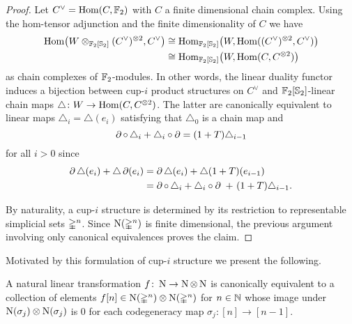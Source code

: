 \begin{proof}
	Let $C^\vee = \mathrm{Hom}(C, {\mathbb{F}_2})$ with $C$ a finite dimensional chain complex.
	Using the hom-tensor adjunction and the finite dimensionality of $C$ we have
	\begin{align*}
	\mathrm{Hom} \big(W \otimes_{{\mathbb{F}_2}[\mathbb{S}_2]} (C^\vee)^{\otimes 2}, C^\vee \big) & \cong
	\mathrm{Hom}_{{\mathbb{F}_2}[\mathbb{S}_2]} \big( W, \mathrm{Hom}((C^\vee)^{\otimes 2}, C^\vee) \big) \\ & \cong
	\mathrm{Hom}_{{\mathbb{F}_2}[\mathbb{S}_2]} \big( W, \mathrm{Hom}(C, C^{\otimes 2}) \big)
	\end{align*}
	as chain complexes of ${\mathbb{F}_2}$-modules.
	In other words, the linear duality functor induces a bijection between \mbox{cup-$i$} product structures on $C^\vee$ and ${\mathbb{F}_2}[\mathbb{S}_2]$-linear chain maps $\triangle \colon W \to \mathrm{Hom}(C, C^{\otimes 2})$.
	The latter are canonically equivalent to linear maps $\triangle_i = \triangle(e_i)$ satisfying that $\triangle_0$ is a chain map and
	\[
	\operatorname{\partial} \circ \, \triangle_i + \triangle_i \circ \operatorname{\partial} =
	(1+T) \triangle_{i-1}
	\]
	for all $i > 0$ since
	\begin{align*}
	\operatorname{\partial} \triangle (e_i) + \triangle \operatorname{\partial}(e_i) &=
	\operatorname{\partial} \triangle (e_i) + \triangle (1+T) (e_{i-1}) \\ &=
	\operatorname{\partial} \circ \, \triangle_i + \triangle_i \circ \operatorname{\partial} \ +\ (1+T) \triangle_{i-1}.
	\end{align*}

	By naturality, a \mbox{cup-$i$} structure is determined by its restriction to representable simplicial sets $\mathbb{\Delta}^n$.
	Since $\operatorname{N}(\mathbb{\Delta}^n)$ is finite dimensional, the previous argument involving only canonical equivalences proves the claim.
\end{proof}

Motivated by this formulation of \mbox{cup-$i$} structure we present the following.

\begin{lemma} \label{l:natural linear map}
	A natural linear transformation $f \colon \operatorname{N} \to \operatorname{N} \otimes \operatorname{N}$ is canonically equivalent to a collection of elements $f[n] \in \operatorname{N}(\mathbb{\Delta}^n) \otimes \operatorname{N}(\mathbb{\Delta}^n)$
	for $n \in \mathbb{N}$ whose image under $\operatorname{N}(\sigma_j) \otimes \operatorname{N}(\sigma_j)$ is $0$
	for each codegeneracy map $\sigma_j \colon [n] \to [n-1]$.
\end{lemma}

